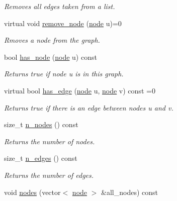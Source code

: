 \begin{DoxyCompactItemize}
\begin{DoxyCompactList}\small\item\em Removes all edges taken from a list. \end{DoxyCompactList}\item 
virtual void \hyperlink{classlgraph_1_1utils_1_1xxgraph_a082e0000394dbf3b0bc5d3976baff593}{remove\-\_\-node} (\hyperlink{namespacelgraph_1_1utils_a7bd66ede3805ef121bc2835bd48de0cf}{node} u)=0
\begin{DoxyCompactList}\small\item\em Rmoves a node from the graph. \end{DoxyCompactList}\item 
\hypertarget{classlgraph_1_1utils_1_1xxgraph_a026ab064c2be26790cc1f547be2157c9}{bool \hyperlink{classlgraph_1_1utils_1_1xxgraph_a026ab064c2be26790cc1f547be2157c9}{has\-\_\-node} (\hyperlink{namespacelgraph_1_1utils_a7bd66ede3805ef121bc2835bd48de0cf}{node} u) const }\label{classlgraph_1_1utils_1_1xxgraph_a026ab064c2be26790cc1f547be2157c9}

\begin{DoxyCompactList}\small\item\em Returns true if node {\itshape u} is in this graph. \end{DoxyCompactList}\item 
virtual bool \hyperlink{classlgraph_1_1utils_1_1xxgraph_a9e94100afc70b09049432f196550407c}{has\-\_\-edge} (\hyperlink{namespacelgraph_1_1utils_a7bd66ede3805ef121bc2835bd48de0cf}{node} u, \hyperlink{namespacelgraph_1_1utils_a7bd66ede3805ef121bc2835bd48de0cf}{node} v) const =0
\begin{DoxyCompactList}\small\item\em Returns true if there is an edge between nodes {\itshape u} and {\itshape v}. \end{DoxyCompactList}\item 
size\-\_\-t \hyperlink{classlgraph_1_1utils_1_1xxgraph_ad345f1fbf1dee34e1579b5aea9aef9b2}{n\-\_\-nodes} () const 
\begin{DoxyCompactList}\small\item\em Returns the number of nodes. \end{DoxyCompactList}\item 
size\-\_\-t \hyperlink{classlgraph_1_1utils_1_1xxgraph_af3f7c3835406c2cbf70479ae1c0253c9}{n\-\_\-edges} () const 
\begin{DoxyCompactList}\small\item\em Returns the number of edges. \end{DoxyCompactList}\item 
\hypertarget{classlgraph_1_1utils_1_1xxgraph_a99f83387aa9f59b861e675251be5a3ad}{void \hyperlink{classlgraph_1_1utils_1_1xxgraph_a99f83387aa9f59b861e675251be5a3ad}{nodes} (vector$<$ \hyperlink{namespacelgraph_1_1utils_a7bd66ede3805ef121bc2835bd48de0cf}{node} $>$ \&all\-\_\-nodes) const }\label{classlgraph_1_1utils_1_1xxgraph_a99f83387aa9f59b861e675251be5a3ad}


\end{DoxyCompactItemize}
